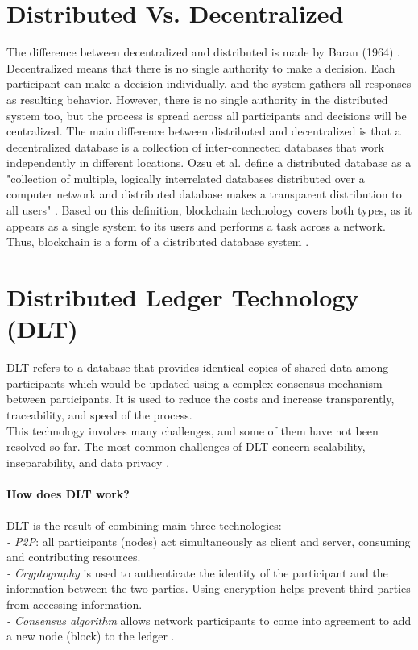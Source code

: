 \section{Distributed Vs. Decentralized } 
The difference between decentralized and distributed is made by Baran (1964) \cite{Baran}. Decentralized means that there is no single authority to make a decision. Each participant can make a decision individually, and the system gathers all responses as resulting behavior. However, there is no single authority in the distributed system too, but the process is spread across all participants and decisions will be centralized. The main difference between distributed and decentralized is that a decentralized database is a collection of inter-connected databases that work independently in different locations. Ozsu et al. \cite{Ozsu} define a distributed database as a "collection of multiple, logically interrelated databases distributed over a computer network and distributed database makes a transparent distribution to all users" \cite{Ozsu}. Based on this definition, blockchain technology covers both types, as it appears as a single system to its users and performs a task across a network. Thus, blockchain is a form of a distributed database system \cite{Markos}.


\section{Distributed Ledger Technology (DLT)} 
DLT refers to a database that provides identical copies of shared data among participants which would be updated using a complex consensus mechanism between participants. It is used to reduce the costs and increase transparently, traceability, and speed of the process.\\
This technology involves many challenges, and some of them have not been resolved so far. The most common challenges of DLT concern scalability, inseparability, and data privacy \cite{Jose}. \\
\\
\textbf{How does DLT work?}\\
\\
DLT is the result of combining main three technologies:\\
\hspace{1cm}\textit{-  P2P}: all participants (nodes) act simultaneously as client and server, consuming and contributing resources.\\
\hspace{1cm}\textit{- Cryptography} is used to authenticate the identity of the participant and the information between the two parties. Using encryption helps prevent third parties from accessing information. \\
\hspace{1cm}\textit{- Consensus algorithm} allows network participants to come into agreement to add a new node (block) to the ledger \cite{Jose}.\\
